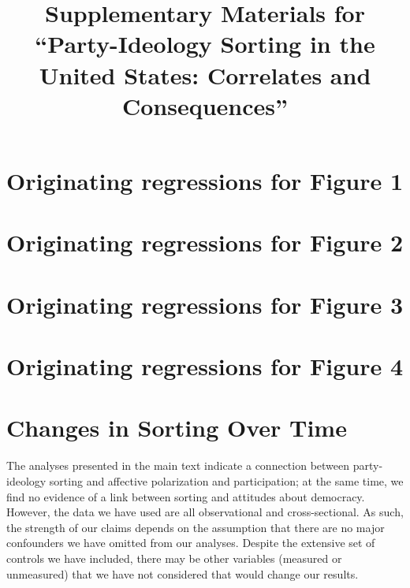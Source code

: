 \documentclass[10pt,landscape]{article}
\title{Supplementary Materials for \\ ``Party-Ideology Sorting in the United States: Correlates and Consequences''}
\author{}
\date{}
\begin{document}
\maketitle
\clearpage
\tableofcontents
\listoffigures
\listoftables
\clearpage


\section{Originating regressions for Figure 1}

\clearpage

\section{Originating regressions for Figure 2}

\clearpage

\section{Originating regressions for Figure 3}

\clearpage

\clearpage

\clearpage

\clearpage

\section{Originating regressions for Figure 4}

\clearpage

\clearpage

\clearpage

\clearpage

\section{Changes in Sorting Over Time}
The analyses presented in the main text indicate a connection between party-ideology sorting and affective polarization and participation; at the same time, we find no evidence of a link between sorting and attitudes about democracy.
However, the data we have used are all observational and cross-sectional. 
As such, the strength of our claims depends on the assumption that there are no major confounders we have omitted from our analyses. 
Despite the extensive set of controls we have included, there may be other variables (measured or unmeasured) that we have not considered that would change our results.
\end{document}
